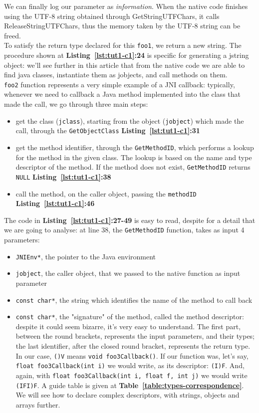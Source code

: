 \documentclass[a4paper,10pt]{article}
\newcommand{\keyword}[1]{\texttt{#1}}
\newcommand{\reft}[1]{\textbf{Table~\ref{#1}}}
\newcommand{\refl}[1]{\textbf{Listing~\ref{#1}}}
\begin{document}
\begin{multicols}{2}
We can finally log our parameter as \textit{information}. When the native code finishes using the UTF-8 string obtained through GetStringUTFChars, it calls ReleaseStringUTFChars, thus the memory taken by the UTF-8 string can be freed.\\
To satisfy the return type declared for this \keyword{foo1}, we return a new string. The procedure shown at \refl{lst:tut1-c1}\textbf{:24} is specific for generating a jstring object: we'll see further in this article that from the native code we are able to find java classes, instantiate them as jobjects, and call methods on them.\\
\keyword{foo2} function represents a very simple example of a JNI callback: typically, whenever we need to callback a Java method implemented into the class that made the call, we go through three main steps:
\begin{itemize}
\item get the class (\keyword{jclass}), starting from the object (\keyword{jobject}) which made the call, through the \keyword{GetObjectClass} \refl{lst:tut1-c1}\textbf{:31}
\item get the method identifier, through the \keyword{GetMethodID}, which performs a lookup for the method in the given class. The lookup is based on
the name and type descriptor of the method. If the method does not exist, \keyword{GetMethodID} returns \keyword{NULL} \refl{lst:tut1-c1}\textbf{:38}
\item call the method, on the caller object, passing the \keyword{methodID} \refl{lst:tut1-c1}\textbf{:46}
\end{itemize}
The code in \refl{lst:tut1-c1}\textbf{:27-49} is easy to read, despite for a detail that we are going to analyse: at line 38, the \keyword{GetMethodID} function, takes as input 4 parameters:
\begin{itemize}
\item \keyword{JNIEnv*}, the pointer to the Java environment
\item \keyword{jobject}, the caller object, that we passed to the native function as input parameter
\item \keyword{const char*}, the string which identifies the name of the method to call back
\item \keyword{const char*}, the "signature" of the method, called the method descriptor: despite it could seem bizarre, it's very easy to understand. The first part, between the round brackets, represents the input parameters, and their types; the last identifier, after the closed round bracket, represents the return type. In our case, \keyword{()V} means \keyword{void foo3Callback()}. If our function was, let's say, \keyword{float foo3Callback(int i)} we would write, as its descriptor: \keyword{(I)F}. And, again, with \keyword{float foo3Callback(int i, float f, int j)} we would write \keyword{(IFI)F}. A guide table is given at \reft{table:types-correspondence}. We will see how to declare complex descriptors, with strings, objects and arrays further.

\end{itemize}
\end{multicols}
\end{document}
